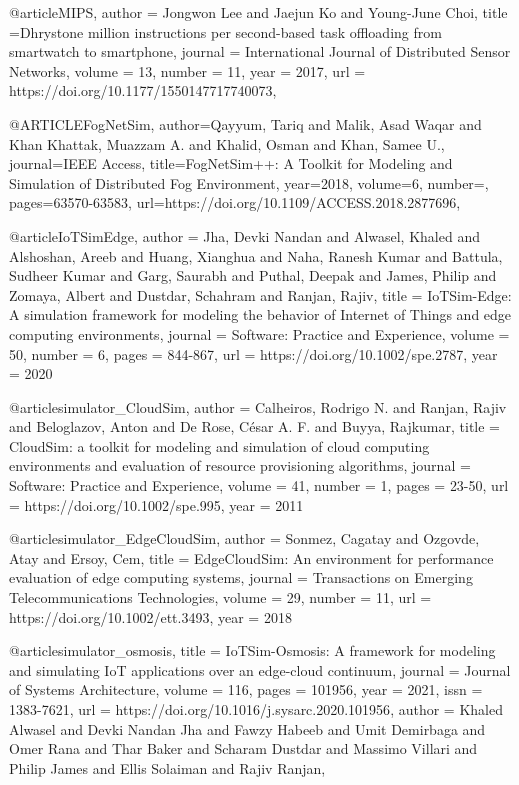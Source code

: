 \documentclass[english,version-2019-11]{uzl-thesis}
\begin{document}
\begin{bibtex-entries}
@article{MIPS,
    author = {Jongwon Lee and Jaejun Ko and Young-June Choi},
    title ={Dhrystone million instructions per second-based task offloading from smartwatch to smartphone},
    journal = {International Journal of Distributed Sensor Networks},
    volume = {13},
    number = {11},
    year = {2017},
    url = {https://doi.org/10.1177/1550147717740073},
}

@ARTICLE{FogNetSim,
  author={Qayyum, Tariq and Malik, Asad Waqar and Khan Khattak, Muazzam A. and Khalid, Osman and Khan, Samee U.},
  journal={IEEE Access}, 
  title={FogNetSim++: A Toolkit for Modeling and Simulation of Distributed Fog Environment}, 
  year={2018},
  volume={6},
  number={},
  pages={63570-63583},
  url={https://doi.org/10.1109/ACCESS.2018.2877696},
  }


@article{IoTSimEdge,
    author = {Jha, Devki Nandan and Alwasel, Khaled and Alshoshan, Areeb and Huang, Xianghua and Naha, Ranesh Kumar and Battula, Sudheer Kumar and Garg, Saurabh and Puthal, Deepak and James, Philip and Zomaya, Albert and Dustdar, Schahram and Ranjan, Rajiv},
    title = {IoTSim-Edge: A simulation framework for modeling the behavior of Internet of Things and edge computing environments},
    journal = {Software: Practice and Experience},
    volume = {50},
    number = {6},
    pages = {844-867},
    url = {https://doi.org/10.1002/spe.2787},
    year = {2020}
}
  
  
@article{simulator_CloudSim,
    author = {Calheiros, Rodrigo N. and Ranjan, Rajiv and Beloglazov, Anton and De Rose, C\'{e}sar A. F. and Buyya, Rajkumar},
    title = {CloudSim: a toolkit for modeling and simulation of cloud computing environments and evaluation of resource provisioning algorithms},
    journal = {Software: Practice and Experience},
    volume = {41},
    number = {1},
    pages = {23-50},
    url = {https://doi.org/10.1002/spe.995},
    year = {2011}
}

@article{simulator_EdgeCloudSim,
    author = {Sonmez, Cagatay and Ozgovde, Atay and Ersoy, Cem},
    title = {EdgeCloudSim: An environment for performance evaluation of edge computing systems},
    journal = {Transactions on Emerging Telecommunications Technologies},
    volume = {29},
    number = {11},
    url = {https://doi.org/10.1002/ett.3493},
    year = {2018}
}

@article{simulator_osmosis,
    title = {IoTSim-Osmosis: A framework for modeling and simulating IoT applications over an edge-cloud continuum},
    journal = {Journal of Systems Architecture},
    volume = {116},
    pages = {101956},
    year = {2021},
    issn = {1383-7621},
    url = {https://doi.org/10.1016/j.sysarc.2020.101956},
    author = {Khaled Alwasel and Devki Nandan Jha and Fawzy Habeeb and Umit Demirbaga and Omer Rana and Thar Baker and Scharam Dustdar and Massimo Villari and Philip James and Ellis Solaiman and Rajiv Ranjan},
}



\end{bibtex-entries}
\end{document}
